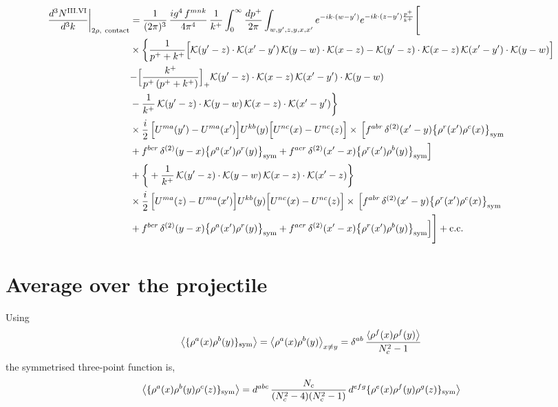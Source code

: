\documentclass[9pt]{article}
\numberwithin{equation}{section}
\begin{document}
\begin{align}
\frac{d^{3}N^{\rm III.VI}}{d^{3}k}\bigg|_{2\rho,\ {\rm contact}}&=\frac{1}{(2\pi)^{3}}\,\frac{ig^{4}\,f^{mnk}}{4\pi^{4}}\,\frac{1}{k^{+}}\int_{0}^{\infty}\frac{dp^{+}}{2\pi}\int_{w,y',z,y,x,x'}e^{-ik\cdot{(w-y')}}e^{-ik\cdot{(z-y')}\frac{p^{+}}{k^{+}}}\Bigg[\notag\\
&\times\bigg\{\frac{1}{p^{+}+k^{+}}\Big[\mathcal{K}(y'-z)\cdot\mathcal{K}(x'-y')\,\mathcal{K}(y-w)\cdot\mathcal{K}(x-z)-\mathcal{K}(y'-z)\cdot\mathcal{K}(x-z)\,\mathcal{K}(x'-y')\cdot\mathcal{K}(y-w)\Big]\notag\\
&{-\Big[\frac{k^{+}}{p^{+}\,(p^{+}+k^{+})}\Big]_{+}\mathcal{K}(y'-z)\cdot\mathcal{K}(x-z)\,\mathcal{K}(x'-y')\cdot\mathcal{K}(y-w)}\notag\\
&-\frac{1}{k^{+}}\,\mathcal{K}(y'-z)\cdot\mathcal{K}(y-w)\,\mathcal{K}(x-z)\cdot\mathcal{K}(x'-y')\bigg\}\notag\\
&\times \frac{i}{2}\,\Big[U^{ma}(y')-U^{ma}(x')\Big]U^{kb}(y)\Big[U^{nc}(x)-U^{nc}(z)\Big]\times\,\Big[f^{abr}\,\delta^{(2)}(x'-y)\big\{\rho^{r}(x')\rho^{c}(x)\big\}_{\rm sym}\notag\\
& +f^{bcr}\,\delta^{(2)}(y-x)\big\{\rho^{a}(x')\rho^{r}(y)\big\}_{\rm sym} +f^{acr}\,\delta^{(2)}(x'-x)\big\{\rho^{r}(x')\rho^{b}(y)\big\}_{\rm sym}\Big]\notag\\
&+\bigg\{+\frac{1}{k^{+}}\,\mathcal{K}(y'-z)\cdot\mathcal{K}(y-w)\,\mathcal{K}(x-z)\cdot\mathcal{K}(x'-z)\bigg\}\notag\\
&\times \frac{i}{2}\,\Big[U^{ma}(z)-U^{ma}(x')\Big]U^{kb}(y)\Big[U^{nc}(x)-U^{nc}(z)\Big]\times\,\Big[f^{abr}\,\delta^{(2)}(x'-y)\big\{\rho^{r}(x')\rho^{c}(x)\big\}_{\rm sym}\notag\\
& +f^{bcr}\,\delta^{(2)}(y-x)\big\{\rho^{a}(x')\rho^{r}(y)\big\}_{\rm sym} +f^{acr}\,\delta^{(2)}(x'-x)\big\{\rho^{r}(x')\rho^{b}(y)\big\}_{\rm sym}\Big]\Bigg]+{\rm c.c.}\label{eq:D-III.VI-2}
\end{align}
\section{Average over the projectile}\label{sec:E}
Using
\begin{align}
\big\langle\{\rho^{a}(x)\rho^{b}(y)\}_{\rm sym}\big\rangle=\big\langle\rho^{a}(x)\rho^{b}(y)\big\rangle_{x\neq y}=\delta^{ab}\,\frac{\langle\rho^{f}(x)\rho^{f}(y)\big\rangle}{N_{c}^{2}-1}
\end{align}
the symmetrised three-point function is,
\begin{align}
\big\langle\{\rho^{a}(x)\rho^{b}(y)\rho^{c}(z)\}_{\rm sym}\big\rangle=d^{abc}\,\frac{N_{c}}{(N_{c}^{2}-4)(N_{c}^{2}-1)}\,d^{efg}\{\rho^{e}(x)\rho^{f}(y)\rho^{g}(z)\}_{\rm sym}\big\rangle
\end{align}
\end{document}
